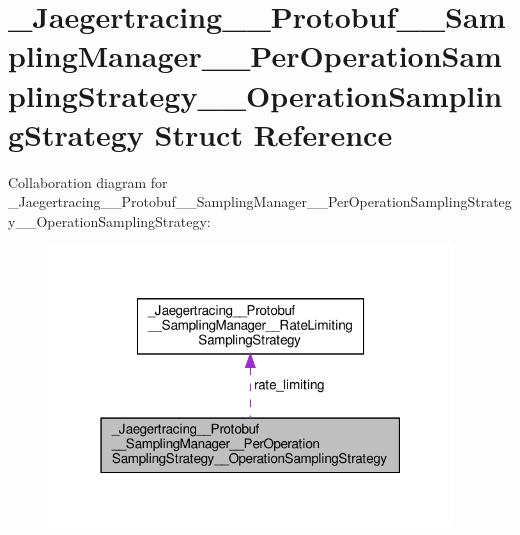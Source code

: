 \hypertarget{struct__Jaegertracing____Protobuf____SamplingManager____PerOperationSamplingStrategy____OperationSamplingStrategy}{}\section{\+\_\+\+Jaegertracing\+\_\+\+\_\+\+Protobuf\+\_\+\+\_\+\+Sampling\+Manager\+\_\+\+\_\+\+Per\+Operation\+Sampling\+Strategy\+\_\+\+\_\+\+Operation\+Sampling\+Strategy Struct Reference}
\label{struct__Jaegertracing____Protobuf____SamplingManager____PerOperationSamplingStrategy____OperationSamplingStrategy}


Collaboration diagram for \+\_\+\+Jaegertracing\+\_\+\+\_\+\+Protobuf\+\_\+\+\_\+\+Sampling\+Manager\+\_\+\+\_\+\+Per\+Operation\+Sampling\+Strategy\+\_\+\+\_\+\+Operation\+Sampling\+Strategy\+:
\nopagebreak
\begin{figure}[H]
\begin{center}
\leavevmode
\includegraphics[width=304pt]{struct__Jaegertracing____Protobuf____SamplingManager____PerOperationSamplingStrategy____OperationSamplingStrategy__coll__graph}
\end{center}
\end{figure}
